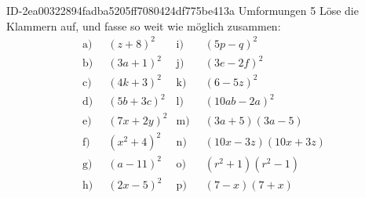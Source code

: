 \begin{exercise}
      {ID-2ea00322894fadba5205ff7080424df775be413a}
      {Umformungen 5}
  \ifproblem\problem
    \newcommand{\gap}{\;\;}%
    Löse die Klammern auf, und fasse so weit wie möglich zusammen:
    \begin{align*}
      \text{a)}\gap & (z+8)^2 &
      \text{i)}\gap & (5p-q)^2
      \\
      \text{b)}\gap & (3a+1)^2 &
      \text{j)}\gap & (3e-2f)^2
      \\
      \text{c)}\gap & (4k+3)^2 &
      \text{k)}\gap & (6-5z)^2
      \\
      \text{d)}\gap & (5b+3c)^2 &
      \text{l)}\gap & (10ab-2a)^2
      \\
      \text{e)}\gap & (7x+2y)^2 &
      \text{m)}\gap & (3a+5)(3a-5)
      \\
      \text{f)}\gap & (x^2+4)^2 &
      \text{n)}\gap & (10x-3z)(10x+3z)
      \\
      \text{g)}\gap & (a-11)^2 &
      \text{o)}\gap & (r^2+1)(r^2-1)
      \\
      \text{h)}\gap & (2x-5)^2 &
      \text{p)}\gap & (7-x)(7+x)
    \end{align*}
  \fi
  \ifoutcome\outcome
    \newcommand{\toprow}[1]
    {%
      \makebox[20em][l]
      {%
        \ensuremath
        {%
          \displaystyle
          \phantom{\,=\:\,}%
          #1%
        }%
      }%
    }%

    \newcommand{\solutionA} { \text{a)}&\quad          (z+8)^2=z^2+16z+256           }
    \newcommand{\solutionB} { \text{b)}&\quad         (3a+1)^2=9a^2+6a+1             }
    \newcommand{\solutionC} { \text{c)}&\quad         (4k+3)^2=16k^2+24k+9           }
    \newcommand{\solutionD} { \text{d)}&\quad        (5b+3c)^2=25b^2+30bc+9c^2       }
    \newcommand{\solutionE} { \text{e)}&\quad        (7x+2y)^2=49x^2+28xy+4y^2       }
    \newcommand{\solutionF} { \text{f)}&\quad        (x^2+4)^2=x^4+8x^2+16           }
    \newcommand{\solutionG} { \text{g)}&\quad         (a-11)^2=a^2-22a+121           }
    \newcommand{\solutionH} { \text{h)}&\quad         (2x-5)^2=4x^2-20x+25           }
    \newcommand{\solutionI} { \text{i)}&\quad         (5p-q)^2=25p^2-10pq+q^2        }
    \newcommand{\solutionJ} { \text{j)}&\quad        (3e-2f)^2=9e^2-12ef+4f^2        }
    \newcommand{\solutionK} { \text{k)}&\quad         (6-5z)^2=36-60z+25z^2          }
    \newcommand{\solutionL} { \text{l)}&\quad      (10ab-2a)^2=100a^2b^2-40a^2b+4a^2 }
    \newcommand{\solutionM} { \text{m)}&\quad     (3a+5)(3a-5)=9a^2-25               }
    \newcommand{\solutionN} { \text{n)}&\quad (10x-3z)(10x+3z)=100x^2-9z^2           }
    \newcommand{\solutionO} { \text{o)}&\quad   (r^2+1)(r^2-1)=r^4-1                 }
    \newcommand{\solutionP} { \text{p)}&\quad       (7-x)(7+x)=49-x^2                }


\end{exercise}
